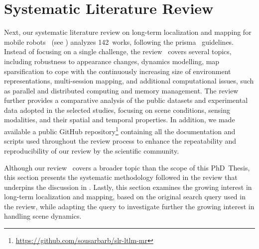 \section{Systematic Literature Review}\label{sec:literature:systematic}
Next, our systematic literature review on long-term localization and mapping
for mobile robots~\cite{sousa:jfr:2023} (see )
analyzes 142~works, following the \gls{prisma}~\cite{page:bmj:2021} guidelines.
Instead of focusing on a single challenge, the review~\cite{sousa:jfr:2023}
covers several topics, including robustness to appearance changes,
dynamics modelling, map sparsification to cope with
the continuously increasing size of environment representations,
multi-session mapping, and additional computational issues,
such as parallel and distributed computing and memory management.
The review~\cite{sousa:jfr:2023} further provides
a comparative analysis of the public datasets and experimental data
adopted in the selected studies, focusing on scene conditions,
sensing modalities, and their spatial and temporal properties.
In addition, we made available a public GitHub
repository\footnote{\label{note:literature:slr}\url{https://github.com/sousarbarb/slr-ltlm-mr}}
containing all the documentation and scripts used throughout the review process
to enhance the repeatability and reproducibility of our review
by the scientific community.

Although our review~\cite{sousa:jfr:2023} covers a broader topic
than the scope of this PhD~Thesis, this section presents
the systematic methodology followed in the review that underpins
the discussion in .
Lastly, this section examines the growing interest in
long-term localization and mapping, based on the original search query
used in the review, while adapting the query to investigate further
the growing interest in handling scene dynamics.

